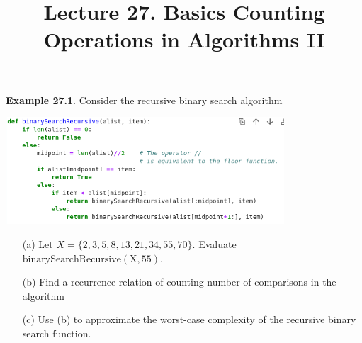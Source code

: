 \documentclass[aspectratio=169]{beamer}
\title{Lecture 27. Basics Counting Operations in Algorithms II}
\date{ }
\providecommand{\Blue}[1]{\textcolor{blue}{#1}}
\begin{document}
\frame[plain]{\titlepage}


\begin{frame}[plain]{ }

 {\bf Example 27.1}. Consider the recursive binary search algorithm
		   
		   \begin{center}
		   	\includegraphics[height=4cm]{./img/lecture27-fig1.png}
		   \end{center}
		   
  \begin{itemize}
   \item[(a)]  Let $X = \{ 2, 3, 5, 8, 13, 21, 34, 55, 70 \}$. Evaluate 
  $ \mathrm{binarySearchRecursive(X, 55)}. $  
  \item[(b)] Find a recurrence relation of counting  number of comparisons in the algorithm
  \item[(c)]  Use (b) to approximate the worst-case complexity of the recursive binary search function.
  \end{itemize}
  
    
    \vspace{.5in} 
	
\end{frame}


    
	
	
	

 


 
\end{document}
